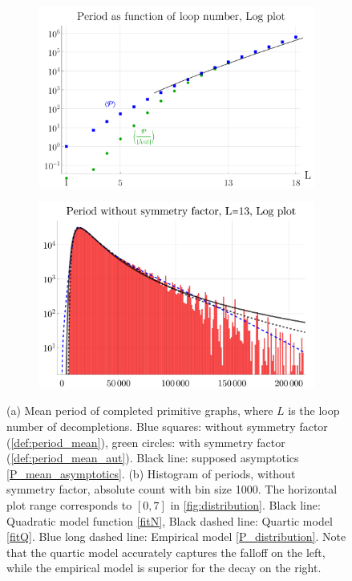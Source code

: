 \documentclass[11pt,a4paper]{article}
\renewcommand{\|}{\rule[-0.4ex]{0.2ex}{1.2em}}
\begin{document}
\begin{figure}[h!]
	\centering
	\begin{subfigure}[b]{.49 \textwidth}
		\includegraphics[width=\linewidth]{period_mean}
		\subcaption{}
		\label{fig:period_mean}
	\end{subfigure}
	\begin{subfigure}[b]{.49 \textwidth}
		\includegraphics[width=\linewidth]{fit_comparison}
		\subcaption{}
		\label{fig:fit_comparison}
	\end{subfigure}
	
	\caption{(a) Mean period of completed primitive graphs, where $L$ is the loop number of decompletions. Blue squares: without symmetry factor (\cref{def:period_mean}), green circles: with symmetry factor (\cref{def:period_mean_aut}). Black line: supposed asymptotics \cref{P_mean_asymptotics}.
		(b) Histogram of periods, without symmetry factor, absolute count with bin size 1000. The horizontal plot range corresponds to $[0,7]$ in \cref{fig:distribution}. Black line: Quadratic model function \cref{fitN}, Black dashed line: Quartic model \cref{fitQ}. Blue long dashed line: Empirical model \cref{P_distribution}.  Note that the quartic model accurately captures the falloff on the left, while the empirical model is superior for the decay on the right.
	}
\end{figure}
\end{document}
